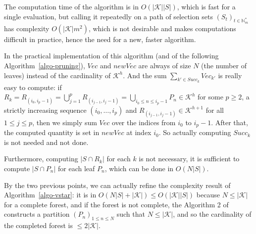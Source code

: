 \documentclass[
  11pt,
  a4paper,
]{article}
\theoremstyle{plain}
\theoremstyle{definition}
\theoremstyle{plain}
\theoremstyle{definition}
\theoremstyle{plain}
\theoremstyle{remark}
\newcounter{quartocallouttipno}
\newcommand{\quartocallouttip}[1]{\refstepcounter{quartocallouttipno}\label{#1}}
\begin{document}
The computation time of the algorithm is in \(O(|\mathcal{K}||S|)\),
which is fast for a single evaluation, but calling it repeatedly on a
path of selection sets \((S_t)_{t\in\mathbb{N}_m^*}\) has complexity
\(O(|\mathcal{K}|m^2)\), which is not desirable and makes computations
difficult in practice, hence the need for a new, faster algorithm.

\begin{tcolorbox}[enhanced jigsaw, arc=.35mm, bottomrule=.15mm, bottomtitle=1mm, breakable, colback=white, colbacktitle=quarto-callout-tip-color!10!white, colframe=quarto-callout-tip-color-frame, coltitle=black, left=2mm, leftrule=.75mm, opacityback=0, opacitybacktitle=0.6, rightrule=.15mm, title=\textcolor{quarto-callout-tip-color}{\faLightbulb}\hspace{0.5em}{Tip \ref*{tip-algo1}}, titlerule=0mm, toprule=.15mm, toptitle=1mm]

\quartocallouttip{tip-algo1} 

In the practical implementation of this algorithm (and of the following
Algorithm~\ref{algo-pruning}), \(Vec\) and \(newVec\) are always of size
\(N\) (the number of leaves) instead of the cardinality of
\(\mathcal{K}^h\). And the sum \(\sum_{k'\in Succ_k} Vec_{k'}\) is
really easy to compute: if
\(R_k= R_{(i_0,i_{p}-1)}= \bigcup_{ j=1}^{p} R_{(i_{ j-1}, i_{ j}-1)}=\bigcup_{i_0\leq n\leq i_{p}-1}P_n\in\mathcal{K}^h\)
for some \(p\geq2\), a strictly increasing sequence
\((i_0,\dotsc,i_{p})\) and
\(R_{(i_{ j-1}, i_{ j}-1)}\in\mathcal{K}^{h+1}\) for all
\(1\leq j\leq p\), then we simply sum \(Vec\) over the indices from
\(i_{0}\) to \(i_{p}-1\). After that, the computed quantity is set in
\(newVec\) at index \(i_0\). So actually computing \(Succ_k\) is not
needed and not done.

Furthermore, computing \(|S\cap R_k|\) for each \(k\) is not necessary,
it is sufficient to compute \(|S\cap P_n|\) for each leaf \(P_n\), which
can be done in \(O(N|S|)\).

By the two previous points, we can actually refine the complexity result
of Algorithm~\ref{algo-vstar}: it is in
\(O(N|S|+|\mathcal{K}|)\leq O(|\mathcal{K}||S|)\) because
\(N\leq|\mathcal{K}|\) for a complete forest, and if the forest is not
complete, the Algorithm 2 of \citet{MR4178188} constructs a partition
\((P_n)_{1\leq n\leq N}\) such that \(N\leq|\mathcal{K}|\), and so the
cardinality of the completed forest is \(\leq 2|\mathcal{K}|\).

\end{tcolorbox}
\end{document}
